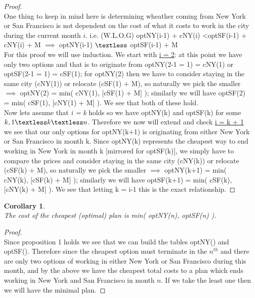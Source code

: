 \documentclass[12pt]{article}
\newtheorem{corollary}[theorem]{Corollary}
\begin{document}
\begin{proof}
~ \\ \indent One thing to keep in mind here is determining wheather coming from New York or San Francisco
is not dependent on the cost of what it costs to work in the city during the current month $i$. i.e.
(W.L.O.G) optNY(i-1) + cNY(i) \textless optSF(i-1) + cNY(i) + M $\implies$ optNY(i-1) $\textless$
optSF(i-1) + M \\
\indent For this proof we will use induction. We start with \underline{i = 2}: at this point we have
only two options and that is to originate from optNY(2-1 = 1) = cNY(1) or optSF(2-1 = 1) = cSF(1); for
optNY(2) then we have to consider staying in the same city (cNY(1)) or relocate (cSF(1) + M), so naturally
we pick the smaller $\implies$ optNY(2) = min( cNY(1), [cSF(1) + M] ); similarly we will have optSF(2) =
min( cSF(1), [cNY(1) + M] ). We see that both of these hold. \\
\indent Now lets assume that \textit{i = k} holds so we have optNY(k) and optSF(k) for some $k, 1 \textless
k \textless n$. Therefore we now will extend and check \underline{i = k + 1} we see that our only options
for optNY(k+1) is originating from either New York or San Francisco in month k. Since optNY(k) represents
the cheapest way to end working in New York in month k [mirrored for optSF(k)], we simply have to compare
the prices and consider staying in the same city (cNY(k)) or relocate (cSF(k) + M), so naturally we pick
the smaller $\implies$ optNY(k+1) = min( cNY(k), [cSF(k) + M] ); similarly we will have optSF(k+1) =
min( cSF(k), [cNY(k) + M] ). We see  that letting k = i-1 this is the exact relationship.
\end{proof}

\begin{corollary}
~ \\ \indent The cost of the cheapest (optimal) plan is min( optNY(n), optSF(n) ).
\end{corollary}

\begin{proof}
~ \\ \indent Since proposition 1 holds we see that we can build the tables optNY() and optSF(). Therefore since the
cheapest option must terminate in the $n^{th}$ and there are only two options of working in either New
York or San Francisco during this month, and by the above we have the cheapest total costs to a plan
which ends working in New York and San Francisco in month $n$. If we take the least one then we will
have the minimal plan.
\end{proof}
\end{document}
